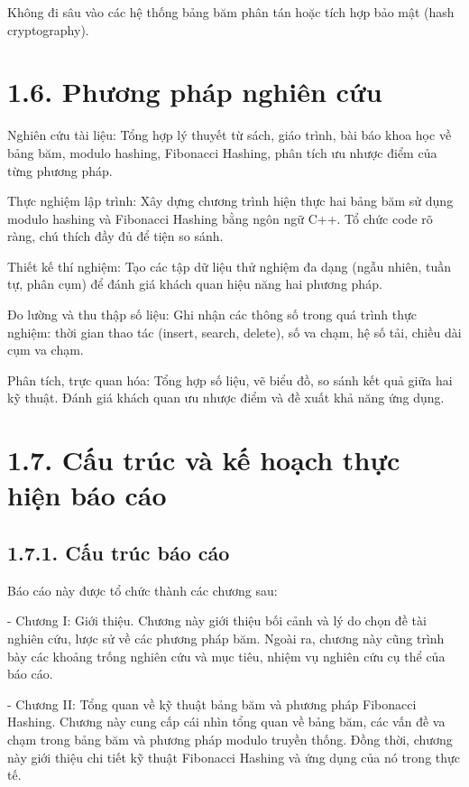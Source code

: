 \documentclass[12pt,a4paper]{report}
\begin{document}
Không đi sâu vào các hệ thống bảng băm phân tán hoặc tích hợp bảo mật (hash cryptography).

\section*{1.6. Phương pháp nghiên cứu}

\noindent \indent Nghiên cứu tài liệu:
Tổng hợp lý thuyết từ sách, giáo trình, bài báo khoa học về bảng băm, modulo hashing, Fibonacci Hashing, phân tích ưu nhược điểm của từng phương pháp.

Thực nghiệm lập trình:
Xây dựng chương trình hiện thực hai bảng băm sử dụng modulo hashing và Fibonacci Hashing bằng ngôn ngữ C++. Tổ chức code rõ ràng, chú thích đầy đủ để tiện so sánh.

Thiết kế thí nghiệm:
Tạo các tập dữ liệu thử nghiệm đa dạng (ngẫu nhiên, tuần tự, phân cụm) để đánh giá khách quan hiệu năng hai phương pháp.

Đo lường và thu thập số liệu:
Ghi nhận các thông số trong quá trình thực nghiệm: thời gian thao tác (insert, search, delete), số va chạm, hệ số tải, chiều dài cụm va chạm.

Phân tích, trực quan hóa:
Tổng hợp số liệu, vẽ biểu đồ, so sánh kết quả giữa hai kỹ thuật. Đánh giá khách quan ưu nhược điểm và đề xuất khả năng ứng dụng.

\section*{1.7. Cấu trúc và kế hoạch thực hiện báo cáo}
\subsection*{1.7.1. Cấu trúc báo cáo}
\noindent \indent Báo cáo này được tổ chức thành các chương sau:

- Chương I: Giới thiệu. Chương này giới thiệu bối cảnh và lý do chọn đề tài nghiên cứu, lược sử về các phương pháp băm. Ngoài ra, chương này cũng trình bày các khoảng trống nghiên cứu và mục tiêu, nhiệm vụ nghiên cứu cụ thể của báo cáo.

- Chương II: Tổng quan về kỹ thuật bảng băm và phương pháp Fibonacci Hashing. Chương này cung cấp cái nhìn tổng quan về bảng băm, các vấn đề va chạm trong bảng băm và phương pháp modulo truyền thống. Đồng thời, chương này giới thiệu chi tiết kỹ thuật Fibonacci Hashing và ứng dụng của nó trong thực tế.
\end{document}
